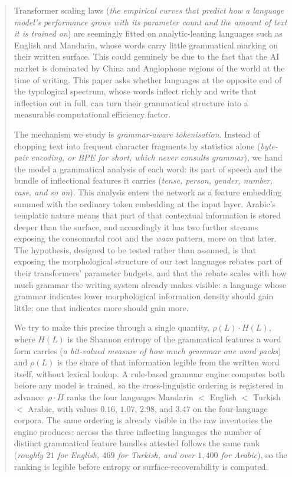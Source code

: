 \begin{abstract}
Transformer scaling laws (\emph{the empirical curves that predict how a language model's performance grows with its parameter count and the amount of text it is trained on}) are seemingly fitted on analytic-leaning languages such as English and Mandarin, whose words carry little grammatical marking on their written surface. This could genuinely be due to the fact that the AI market is dominated by China and Anglophone regions of the world at the time of writing. This paper asks whether languages at the opposite end of the typological spectrum, whose words inflect richly and write that inflection out in full, can turn their grammatical structure into a measurable computational efficiency factor.

The mechanism we study is \emph{grammar-aware tokenisation}. Instead of chopping text into frequent character fragments by statistics alone (\emph{byte-pair encoding, or BPE for short, which never consults grammar}), we hand the model a grammatical analysis of each word: its part of speech and the bundle of inflectional features it carries (\emph{tense, person, gender, number, case, and so on}). This analysis enters the network as a feature embedding summed with the ordinary token embedding at the input layer. Arabic's templatic nature means that part of that contextual information is stored deeper than the surface, and accordingly it has two further streams exposing the consonantal root and the \emph{wazn} pattern, more on that later. The hypothesis, designed to be tested rather than assumed, is that exposing the morphological structure of our test languages rebates part of their transformers' parameter budgets, and that the rebate scales with how much grammar the writing system already makes visible: a language whose grammar indicates lower morphological information density should gain little; one that indicates more should gain more.

We try to make this precise through a single quantity, $\rho(L) \cdot H(L)$, where $H(L)$ is the Shannon entropy of the grammatical features a word form carries (\emph{a bit-valued measure of how much grammar one word packs}) and $\rho(L)$ is the share of that information legible from the written word itself, without lexical lookup. A rule-based grammar engine computes both before any model is trained, so the cross-linguistic ordering is registered in advance: $\rho \cdot H$ ranks the four languages Mandarin $<$ English $<$ Turkish $<$ Arabic, with values $0.16$, $1.07$, $2.98$, and $3.47$ on the four-language corpora. The same ordering is already visible in the raw inventories the engine produces: across the three inflecting languages the number of distinct grammatical feature bundles attested follows the same rank (\emph{roughly $21$ for English, $469$ for Turkish, and over $1{,}400$ for Arabic}), so the ranking is legible before entropy or surface-recoverability is computed.


\end{abstract}
